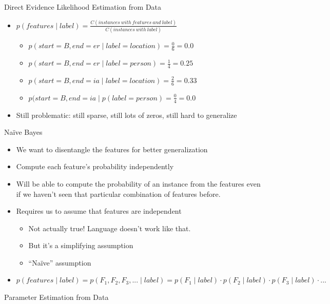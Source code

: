 \documentclass[11pt,letterpaper]{article}
\begin{document}
Direct Evidence Likelihood Estimation from Data

\begin{itemize}
  \item $p(features \mid label) = \frac{C(instances~with~features~and~label)}{C(instances~with~label)}$
    \begin{itemize}
      \item $p(start=B, end=er \mid label=location) = \frac{0}{6} = 0.0$
      \item $p(start=B, end=er \mid label=person) = \frac{1}{4} = 0.25$
      \\
      \item $p(start=B, end=ia \mid label=location) = \frac{2}{6} = 0.33$
      \item $p(start=B, end=ia \mid p(label=person) = \frac{0}{4} = 0.0$
    \end{itemize}
  \item Still problematic: still sparse, still lots of zeros, still hard to generalize
\end{itemize}


Na\"{i}ve Bayes

\begin{itemize}
  \item We want to disentangle the features for better generalization
  \item Compute each feature's probability independently
  \item Will be able to compute the probability of an instance from the features even if we haven't seen that particular combination of features before.
  \item Requires us to assume that features are independent
    \begin{itemize}
      \item Not actually true!  Language doesn't work like that.
      \item But it's a simplifying assumption
      \item ``Na\"{i}ve'' assumption
    \end{itemize}
  \item $p(features \mid label) = p(F_1, F_2, F_3, ... \mid label) = p(F_1 \mid label) \cdot p(F_2 \mid label) \cdot p(F_3 \mid label) \cdot ...$
\end{itemize}


Parameter Estimation from Data
\end{document}
